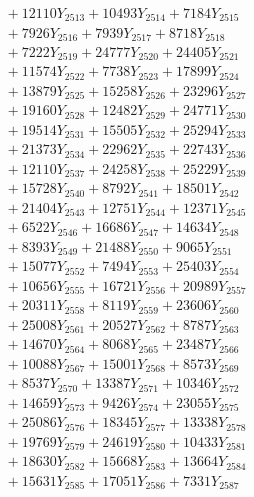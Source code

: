 \documentclass[a4paper,10pt]{article}
\begin{document}
{\begin{align}
&\;  + 12110 Y_{2513} + 10493 Y_{2514} + 7184 Y_{2515} \\[0.3ex]
&\;  + 7926 Y_{2516} + 7939 Y_{2517} + 8718 Y_{2518} \\[0.5ex]\allowbreak
&\;  + 7222 Y_{2519} + 24777 Y_{2520} + 24405 Y_{2521} \\[0.3ex]
&\;  + 11574 Y_{2522} + 7738 Y_{2523} + 17899 Y_{2524} \\[0.3ex]
&\;  + 13879 Y_{2525} + 15258 Y_{2526} + 23296 Y_{2527} \\[0.3ex]
&\;  + 19160 Y_{2528} + 12482 Y_{2529} + 24771 Y_{2530} \\[0.3ex]
&\;  + 19514 Y_{2531} + 15505 Y_{2532} + 25294 Y_{2533} \\[0.3ex]
&\;  + 21373 Y_{2534} + 22962 Y_{2535} + 22743 Y_{2536} \\[0.3ex]
&\;  + 12110 Y_{2537} + 24258 Y_{2538} + 25229 Y_{2539} \\[0.3ex]
&\;  + 15728 Y_{2540} + 8792 Y_{2541} + 18501 Y_{2542} \\[0.3ex]
&\;  + 21404 Y_{2543} + 12751 Y_{2544} + 12371 Y_{2545} \\[0.3ex]
&\;  + 6522 Y_{2546} + 16686 Y_{2547} + 14634 Y_{2548} \\[0.5ex]\allowbreak
&\;  + 8393 Y_{2549} + 21488 Y_{2550} + 9065 Y_{2551} \\[0.3ex]
&\;  + 15077 Y_{2552} + 7494 Y_{2553} + 25403 Y_{2554} \\[0.3ex]
&\;  + 10656 Y_{2555} + 16721 Y_{2556} + 20989 Y_{2557} \\[0.3ex]
&\;  + 20311 Y_{2558} + 8119 Y_{2559} + 23606 Y_{2560} \\[0.3ex]
&\;  + 25008 Y_{2561} + 20527 Y_{2562} + 8787 Y_{2563} \\[0.3ex]
&\;  + 14670 Y_{2564} + 8068 Y_{2565} + 23487 Y_{2566} \\[0.3ex]
&\;  + 10088 Y_{2567} + 15001 Y_{2568} + 8573 Y_{2569} \\[0.3ex]
&\;  + 8537 Y_{2570} + 13387 Y_{2571} + 10346 Y_{2572} \\[0.3ex]
&\;  + 14659 Y_{2573} + 9426 Y_{2574} + 23055 Y_{2575} \\[0.3ex]
&\;  + 25086 Y_{2576} + 18345 Y_{2577} + 13338 Y_{2578} \\[0.5ex]\allowbreak
&\;  + 19769 Y_{2579} + 24619 Y_{2580} + 10433 Y_{2581} \\[0.3ex]
&\;  + 18630 Y_{2582} + 15668 Y_{2583} + 13664 Y_{2584} \\[0.3ex]
&\;  + 15631 Y_{2585} + 17051 Y_{2586} + 7331 Y_{2587} \\[0.3ex]

\end{align}}
\end{document}
